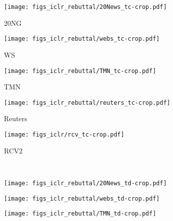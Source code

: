 \documentclass{article}
\begin{document}
\begin{figure}[t]
        \centering
         \begin{subfigure}[b]{0.19\linewidth}
                 \centering
                 \caption{20NG}
                 \texttt{[image: figs\_iclr\_rebuttal/20News\_tc-crop.pdf]}
         \end{subfigure}
         \begin{subfigure}[b]{0.19\linewidth}
                 \centering
                 \caption{WS}
                 \texttt{[image: figs\_iclr\_rebuttal/webs\_tc-crop.pdf]}
         \end{subfigure} 
         \begin{subfigure}[b]{0.19\linewidth}
                 \centering
                 \caption{TMN}
                 \texttt{[image: figs\_iclr\_rebuttal/TMN\_tc-crop.pdf]}
         \end{subfigure}\begin{subfigure}[b]{0.19\linewidth}
                 \centering
                \caption{Reuters}
                 \texttt{[image: figs\_iclr\_rebuttal/reuters\_tc-crop.pdf]}
         \end{subfigure}
          \begin{subfigure}[b]{0.19\linewidth}
                 \centering
                \caption{RCV2}
                 \texttt{[image: figs\_iclr/rcv\_tc-crop.pdf]}
         \end{subfigure}
         \vspace{0.3cm}
        \\
               \centering
         \begin{subfigure}[b]{0.19\linewidth}
                 \centering
                 \texttt{[image: figs\_iclr\_rebuttal/20News\_td-crop.pdf]}
         \end{subfigure}
         \begin{subfigure}[b]{0.19\linewidth}
                 \centering
                 \texttt{[image: figs\_iclr\_rebuttal/webs\_td-crop.pdf]}
         \end{subfigure} 
         \begin{subfigure}[b]{0.19\linewidth}
                 \centering
                 \texttt{[image: figs\_iclr\_rebuttal/TMN\_td-crop.pdf]}
         \end{subfigure}\begin{subfigure}[b]{0.19\linewidth}

\end{subfigure}
\end{figure}
\end{document}
